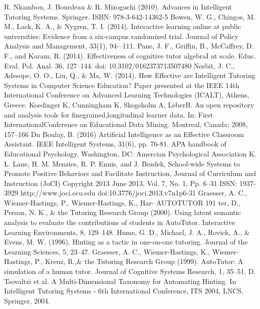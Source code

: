 \documentclass[letterpaper%
, twoside%
, 12pt%
,these%
, english%
,creativecommons,hyperref, withAlgo2e %
]{thETS}
\begin{document}
\begin{thebibliography}{01}
		
			   R. Nkambou, J. Bourdeau \& R. Mizoguchi (2010). Advances in Intelligent Tutoring Systems. Springer. ISBN: 978-3-642-14362-5
		   Bowen, W. G., Chingos, M. M., Lack, K. A., \& Nygren, T. I. (2014). Interactive learning online at public universities: Evidence from a six-campus randomized trial. Journal of Policy Analysis and Management, 33(1), 94-–111.	
		  Pane, J. F., Griffin, B., McCaffrey, D. F., and Karam, R. (2014). Effectiveness of cognitive tutor algebraI at scale. Educ. Eval. Pol. Anal. 36, 127–144. doi: 10.3102/0162373713507480
		  Nesbit, J. C., Adesope, O. O., Liu, Q., \& Ma, W. (2014). How Effective are Intelligent Tutoring Systems in Computer Science Education? Paper presented at the IEEE 14th International Conference on Advanced Learning Technologies (ICALT), Athens, Greece.
		  Koedinger K, Cunningham K, Skogsholm A, LeberB. An open repository and analysis tools for finegrained,longitudinal learner data. In: First InternationalConference on Educational Data Mining. Montreal, Canada; 2008, 157–166
		  Du Boulay, B. (2016) Artificial Intelligence as an Effective Classroom Assistant. IEEE Intelligent Systems, 31(6), pp. 76-81. APA handbook of Educational Psychology. Washington, DC: Amercian Psychological Association
		  K. L. Lane, H. M. Menzies, R. P. Ennis, and J. Bezdek, School-wide Systems to Promote Positive Behaviors and Facilitate Instruction, Journal of Curriculum and Instruction (JoCI) Copyright 2013 June 2013, Vol. 7, No. 1, Pp. 6--31 ISSN: 1937-3929 http://www.joci.ecu.edu doi:10.3776/joci.2013.v7n1p6-31
		  Graesser, A. C., Wiemer-Hastings, P., Wiemer-Hastings, K., Har- AUTOTUTOR 191 ter, D., Person, N. K., \& the Tutoring Research Group (2000). Using latent semantic analysis to evaluate the contributions of students in AutoTutor. Interactive Learning Environments, 8, 129--148.
		  Hume, G. D., Michael, J. A., Rovick, A., \& Evens, M. W. (1996). Hinting as a tactic in one-on-one tutoring. Journal of the Learning Sciences, 5, 23--47.
		  Graesser, A. C., Wiemer-Hastings, K., Wiemer-Hastings, P., Kreuz, R.,\& the Tutoring Research Group (1999). AutoTutor: A simulation of a human tutor. Journal of Cognitive Systems Research, 1, 35--51.
		  D. Tsovaltzi et al. A Multi-Dimensional Taxonomy for Automating Hinting. In Intelligent Tutoring Systems  - 6th International Conference, ITS 2004, LNCS. Springer, 2004. 
	
		
		

\end{thebibliography}
\end{document}
